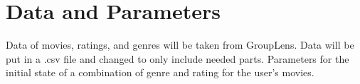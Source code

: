 \documentclass{article}
\begin{document}
\section{Data and Parameters}
Data of movies, ratings, and genres will be taken from GroupLens. Data will be put in a .csv file and changed to 
only include needed parts. Parameters for the initial state of a combination of genre and rating for the user's movies.


\end{document}

